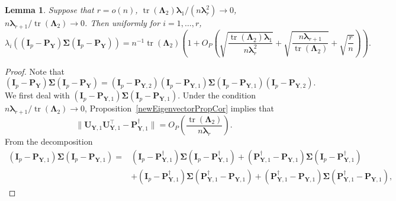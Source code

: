 \documentclass[12pt]{article} %
\DeclareMathOperator{\mytr}{tr}
\newcommand{\bP}{\mathbf{P}}
\newcommand{\bY}{\mathbf{Y}}
\newcommand{\bI}{\mathbf{I}}
\newcommand{\bU}{\mathbf{U}}
\newcommand{\bfsym}[1]{\ensuremath{\boldsymbol{#1}}}
\def\blambda {\bfsym {\lambda}}
\def\bLambda {\bfsym {\Lambda}}
\def\bSigma {\bfsym {\Sigma}}
\newtheorem{lemma}{Lemma}
\theoremstyle{definition}
\begin{document}
\begin{appendices}
\begin{lemma}\label{gg:Lemma1}
    Suppose that
    $r=o(n)$, $\mytr(\bLambda_2)\blambda_1/(n\blambda_r^2)\to 0$,
    $n\blambda_{r+1}/\mytr(\bLambda_2)\to 0$.
    Then uniformly for $i=1,\ldots, r$,
\begin{equation*}
    \lambda_i\left(
             (\bI_p -\bP_\bY)\bSigma (\bI_p- \bP_{\bY})
         \right)
         =
             n^{-1}\mytr(\bLambda_2)
             \left(1
             +O_P\left(
                     \sqrt{\frac{\mytr(\bLambda_2)\blambda_1}{n\blambda_r^2}}  
                     +\sqrt{\frac{n\blambda_{r+1}}{\mytr(\bLambda_2)}}
                     +\sqrt{\frac{r}{n}}
             \right)
         \right)
             .
\end{equation*}

\end{lemma}
\begin{proof}
    Note that
    \begin{equation}\label{cho111}
         (\bI_p-\bP_{\bY})\bSigma (\bI_p-\bP_{\bY})
         =
         (\bI_p-\bP_{\bY,2})
         (\bI_p-\bP_{\bY,1})
         \bSigma 
         (\bI_p-\bP_{\bY,1})
         (\bI_p-\bP_{\bY,2}).
    \end{equation}
We first deal with
    $
         (\bI_p-\bP_{\bY,1})
         \bSigma 
         (\bI_p-\bP_{\bY,1})
         $.
Under the condition $n\blambda_{r+1}/\mytr(\bLambda_2)\to 0$, Proposition~\ref{newEigenvectorPropCor} implies that
\begin{equation*}\label{rain1}
        \|\bU_{\bY,1}\bU_{\bY,1}^\top - 
\bP^\dagger_{\bY,1}
        \|
    =O_P\left(\frac{\mytr(\bLambda_2)}{n\blambda_r}\right).
\end{equation*}
    From the decomposition
         \begin{equation*}
         \begin{split}
         (\bI_p-\bP_{\bY,1})
         \bSigma 
         (\bI_p-\bP_{\bY,1})
         =&
         (\bI_p-\bP_{\bY,1}^{\dagger})
         \bSigma 
         (\bI_p-\bP_{\bY,1}^{\dagger})
         +
         (\bP_{\bY,1}^{\dagger}-\bP_{\bY,1})
         \bSigma 
         (\bI_p-\bP_{\bY,1}^{\dagger})
         \\
         &+
         (\bI_p-\bP_{\bY,1}^{\dagger})
         \bSigma 
         (\bP_{\bY,1}^{\dagger}-\bP_{\bY,1})
         +
         (\bP_{\bY,1}^{\dagger}-\bP_{\bY,1})
         \bSigma 
         (\bP_{\bY,1}^{\dagger}-\bP_{\bY,1}),
         \end{split}
         \end{equation*}

\end{proof}
\end{appendices}
\end{document}
